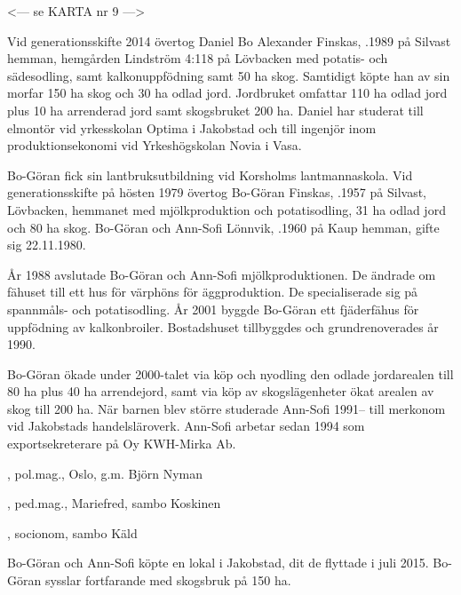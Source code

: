 
<--- se KARTA nr 9 --->





Vid generationsskifte 2014 övertog Daniel Bo Alexander Finskas, .1989 på Silvast hemman, hemgården Lindström 4:118 på Lövbacken med potatis- och sädesodling, samt kalkonuppfödning samt 50 ha skog. Samtidigt köpte han av sin morfar 150 ha skog och 30 ha odlad jord. Jordbruket omfattar 110 ha odlad jord plus 10 ha arrenderad jord samt skogsbruket 200 ha. Daniel har studerat till elmontör vid yrkesskolan Optima i Jakobstad och till ingenjör inom produktionsekonomi vid Yrkeshögskolan Novia i Vasa.


Bo-Göran fick sin lantbruksutbildning vid Korsholms lantmannaskola. Vid generationsskifte på hösten 1979 övertog Bo-Göran Finskas, .1957 på Silvast, Lövbacken, hemmanet med mjölkproduktion och potatisodling, 31 ha odlad jord och 80 ha skog. Bo-Göran och Ann-Sofi Lönnvik, .1960 på Kaup hemman, gifte sig 22.11.1980.

År 1988 avslutade Bo-Göran och Ann-Sofi mjölkproduktionen. De ändrade om fähuset till ett hus för värphöns för äggproduktion. De specialiserade sig på spannmåls- och potatisodling. År 2001 byggde Bo-Göran ett fjäderfähus för uppfödning av kalkonbroiler. Bostadshuset tillbyggdes och grundrenoverades år 1990.

Bo-Göran ökade under 2000-talet via köp och nyodling den odlade jordarealen till 80 ha plus 40 ha arrendejord, samt via köp av skogslägenheter ökat arealen av skog till 200 ha. När 	barnen blev större studerade Ann-Sofi 1991-- till merkonom vid 	Jakobstads handelsläroverk. Ann-Sofi arbetar sedan 1994 som exportsekreterare på Oy KWH-Mirka Ab.
\begin{jhchildren}
  \item {}, pol.mag., Oslo, g.m. Björn Nyman
  \item {}, ped.mag., Mariefred, sambo Koskinen
  \item {}, socionom, sambo Käld
  \item {}
\end{jhchildren}
Bo-Göran och Ann-Sofi köpte en lokal i Jakobstad, dit de flyttade i juli 2015. Bo-Göran sysslar fortfarande med skogsbruk på 150 ha.


